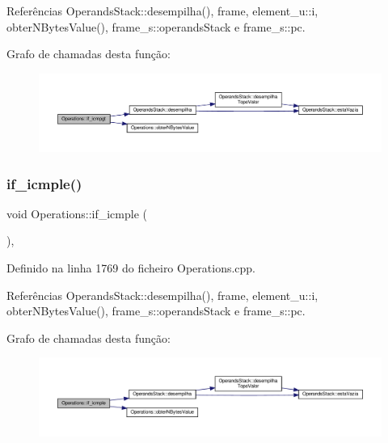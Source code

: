 Referências Operands\+Stack\+::desempilha(), frame, element\+\_\+u\+::i, obter\+N\+Bytes\+Value(), frame\+\_\+s\+::operands\+Stack e frame\+\_\+s\+::pc.

Grafo de chamadas desta função\+:
\nopagebreak
\begin{figure}[H]
\begin{center}
\leavevmode
\includegraphics[width=350pt]{classOperations_a40232532d2522ef0afe261555688a7fd_cgraph}
\end{center}
\end{figure}
\mbox{\label{classOperations_a7a5736e30fcd41a1bccb71c615c4e68d}} 
\subsubsection{\texorpdfstring{if\+\_\+icmple()}{if\_icmple()}}
{\footnotesize\ttfamily void Operations\+::if\+\_\+icmple (\begin{DoxyParamCaption}{ }\end{DoxyParamCaption})\hspace{0.3cm}{\ttfamily [static]}, {\ttfamily [private]}}



Definido na linha 1769 do ficheiro Operations.\+cpp.



Referências Operands\+Stack\+::desempilha(), frame, element\+\_\+u\+::i, obter\+N\+Bytes\+Value(), frame\+\_\+s\+::operands\+Stack e frame\+\_\+s\+::pc.

Grafo de chamadas desta função\+:
\nopagebreak
\begin{figure}[H]
\begin{center}
\leavevmode
\includegraphics[width=350pt]{classOperations_a7a5736e30fcd41a1bccb71c615c4e68d_cgraph}
\end{center}
\end{figure}
\mbox{\label{classOperations_a06f624059cfada3f4a726d0482078aaa}} 
